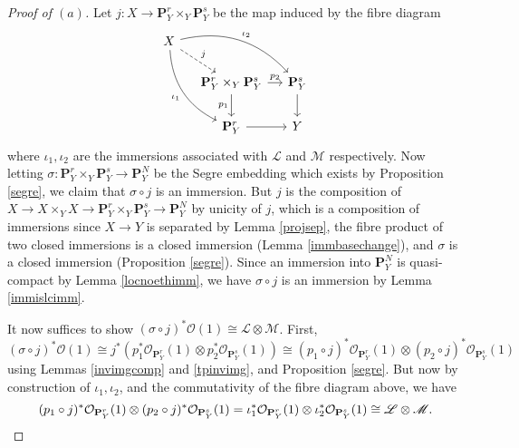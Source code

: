 \documentclass[12pt,letterpaper]{article}
\theoremstyle{definition}
\theoremstyle{remark}
\numberwithin{equation}{section}
\numberwithin{figure}{problem}
\newcommand{\LL}{\mathscr{L}}
\newcommand{\MM}{\mathscr{M}}
\newcommand{\OO}{\mathcal{O}}
\begin{document}
\begin{proof}[Proof of $(a)$]
  Let $j\colon X \to \mathbf{P}^r_Y \times_Y \mathbf{P}^s_Y$ be the map induced by the fibre diagram
  \begin{equation*}
    \begin{tikzcd}[column sep=small]
      X\arrow[dashed]{dr}{j}\arrow[bend right]{ddr}[swap]{\iota_1}\arrow[bend left]{drr}{\iota_2}\\
      & \mathbf{P}^r_Y \times_Y \mathbf{P}^s_Y \rar{p_2}\dar[swap]{p_1} & \mathbf{P}^s_Y\dar\\
      & \mathbf{P}^r_Y \rar & Y
    \end{tikzcd}
  \end{equation*}
  where $\iota_1,\iota_2$ are the immersions associated with $\LL$ and $\MM$ respectively. Now letting $\sigma\colon \mathbf{P}^r_Y \times_Y \mathbf{P}^s_Y \to \mathbf{P}^N_Y$ be the Segre embedding which exists by Proposition \ref{segre}, we claim that $\sigma \circ j$ is an immersion. But $j$ is the composition of $X \to X \times_Y X \to \mathbf{P}^r_Y \times_Y \mathbf{P}^s_Y \to \mathbf{P}^N_Y$ by unicity of $j$, which is a composition of immersions since $X \to Y$ is separated by Lemma \ref{projsep}, the fibre product of two closed immersions is a closed immersion (Lemma \ref{immbasechange}), and $\sigma$ is a closed immersion (Proposition \ref{segre}). Since an immersion into $\mathbf{P}_Y^N$ is quasi-compact by Lemma \ref{locnoethimm}, we have $\sigma \circ j$ is an immersion by Lemma \ref{immislcimm}.
  \par It now suffices to show $(\sigma \circ j)^*\OO(1) \cong \LL \otimes \MM$. First,
  \begin{equation*}
    (\sigma \circ j)^*\OO(1) \cong j^*(p_1^*\OO_{\mathbf{P}^r_Y}(1) \otimes p_2^*\OO_{\mathbf{P}^s_Y}(1)) \cong (p_1 \circ j)^*\OO_{\mathbf{P}^r_Y}(1) \otimes (p_2 \circ j)^*\OO_{\mathbf{P}^s_Y}(1)
  \end{equation*}
  using Lemmas \ref{invimgcomp} and \ref{tpinvimg}, and Proposition \ref{segre}. But now by construction of $\iota_1,\iota_2$, and the commutativity of the fibre diagram above, we have
  \begin{equation*}
    (p_1 \circ j)^*\OO_{\mathbf{P}^r_Y}(1) \otimes (p_2 \circ j)^*\OO_{\mathbf{P}^s_Y}(1) = \iota_1^*\OO_{\mathbf{P}^r_Y}(1) \otimes \iota_2^*\OO_{\mathbf{P}^s_Y}(1) \cong \LL \otimes \MM.\qedhere
  \end{equation*}
\end{proof}
\end{document}
